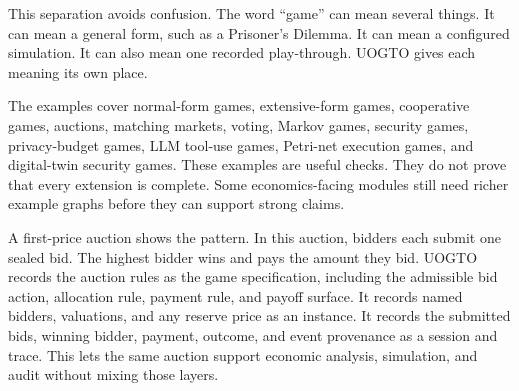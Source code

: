 \documentclass[11pt]{article}
\begin{document}
This separation avoids confusion. The word ``game'' can mean several things. It can mean a general form, such as a Prisoner's Dilemma. It can mean a configured simulation. It can also mean one recorded play-through. UOGTO gives each meaning its own place.

The examples cover normal-form games, extensive-form games, cooperative games, auctions, matching markets, voting, Markov games, security games, privacy-budget games, LLM tool-use games, Petri-net execution games, and digital-twin security games. These examples are useful checks. They do not prove that every extension is complete. Some economics-facing modules still need richer example graphs before they can support strong claims.

A first-price auction shows the pattern. In this auction, bidders each submit one sealed bid. The highest bidder wins and pays the amount they bid. UOGTO records the auction rules as the game specification, including the admissible bid action, allocation rule, payment rule, and payoff surface. It records named bidders, valuations, and any reserve price as an instance. It records the submitted bids, winning bidder, payment, outcome, and event provenance as a session and trace. This lets the same auction support economic analysis, simulation, and audit without mixing those layers.

\begin{center}
\end{center}
\end{document}
